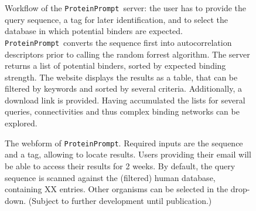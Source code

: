 \documentclass{article}
\newcommand{\tool}{\texttt{ProteinPrompt}}
\begin{document}
\begin{figure}
  
  \caption{Workflow of the \tool\  server: the user has to provide the query sequence, a tag for later identification, and to select the database in which potential binders are expected. \tool\  converts the sequence first into autocorrelation descriptors prior to calling the random forrest algorithm. The server returns a list of potential binders, sorted by expected binding strength. The website displays the results as a table, that can be filtered by keywords and sorted by several criteria. Additionally, a download link is provided. Having accumulated the lists for several queries, connectivities and thus complex binding networks can be explored. }
\end{figure}

\begin{figure}
%  
  \caption{The webform of \tool.
    Required inputs are the sequence and a tag, allowing to locate results.
    Users providing their email will be able to access their results for 2 weeks.
    By default, the query sequence is scanned against the (filtered) human database, containing XX entries.
    Other organisms can be selected in the drop-down.
    (Subject to further development until publication.)}
\end{figure}






\end{document}
